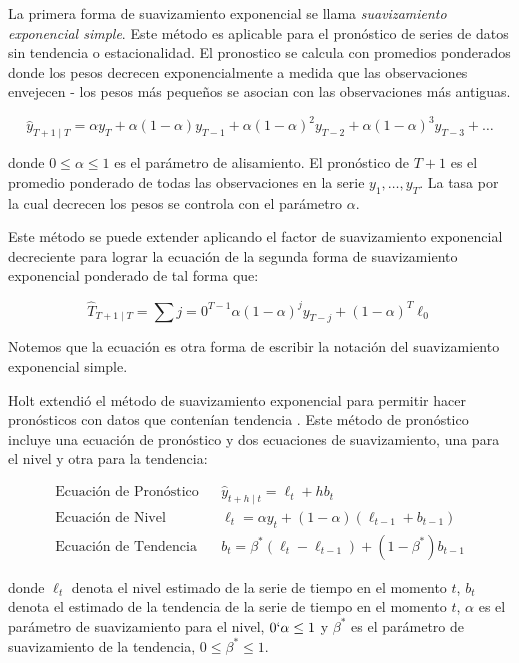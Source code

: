 La primera forma de suavizamiento exponencial se llama \emph{suavizamiento exponencial simple}. Este método es aplicable para el pronóstico de series de datos sin tendencia o estacionalidad. El pronostico se calcula con promedios ponderados donde los pesos decrecen exponencialmente a medida que las observaciones envejecen - los pesos más pequeños se asocian con las observaciones más antiguas. 

\[ \hat{y}_{T+1 \mid T} = \alpha y_{T} + \alpha(1-\alpha) y_{T-1} + \alpha(1-\alpha)^2 y_{T-2} + \alpha(1-\alpha)^3 y_{T-3} + \ldots \]

donde $0 \leq \alpha \leq 1$ es el parámetro de alisamiento. El pronóstico de $T + 1$ es el promedio ponderado de todas las observaciones en la serie $y_1, \ldots, y_T$. La tasa por la cual decrecen los pesos se controla con el parámetro $\alpha$.

Este método se puede extender aplicando el factor de suavizamiento exponencial decreciente para lograr la ecuación de la segunda forma de suavizamiento exponencial ponderado de tal forma que:

\[ \hat{T}_{T+1 \mid T} = \sum{j=0}^{T-1} \alpha(1-\alpha)^j y_{T-j} + (1-\alpha)^{T} \ell_{0}  \]

Notemos que la ecuación es otra forma de escribir la notación del suavizamiento exponencial simple. 

Holt extendió el método de suavizamiento exponencial para permitir hacer pronósticos con datos que contenían tendencia \cite{hyndman}. Este método de pronóstico incluye una ecuación de pronóstico y dos ecuaciones de suavizamiento, una para el nivel y otra para la tendencia:

\begin{eqnarray*}
	\text{Ecuación de Pronóstico}&&\hat{y}_{t+h \mid t} = \ell_{t} + hb_{t} \\
	\text{Ecuación de Nivel}&&\ell_{t} = \alpha y_{t} + (1 - \alpha)(\ell_{t-1} + b_{t-1}) \\
	\text{Ecuación de Tendencia}&&b_{t} = \beta^{*}(\ell_{t} - \ell_{t-1}) + (1 - \beta^{*})b_{t-1}  
\end{eqnarray*}

donde $\ell_{t}$ denota el nivel estimado de la serie de tiempo en el momento $t$, $b_{t}$ denota el estimado de la tendencia de la serie de tiempo en el momento $t$, $\alpha$ es el parámetro de suavizamiento para el nivel, $0 \lq \alpha \leq 1$ y $\beta^{*}$ es el parámetro de suavizamiento de la tendencia, $0 \leq \beta^{*} \leq 1$.

